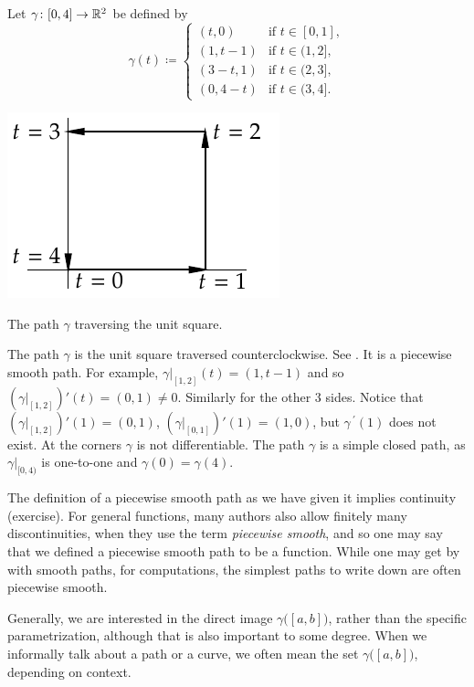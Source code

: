 \begin{example} \label{mv:example:unitsquarepath}
Let $\gamma \colon [0,4] \to {\mathbb{R}}^2$ be defined by
\begin{equation*}
\gamma(t) \coloneqq
\begin{cases}
(t,0)   & \text{if } t \in [0,1],\\
(1,t-1) & \text{if } t \in (1,2],\\
(3-t,1) & \text{if } t \in (2,3],\\
(0,4-t) & \text{if } t \in (3,4].
\end{cases}
\end{equation*}
\begin{myfigureht}
\includegraphics{figures/squarepath}
\caption{The path $\gamma$ traversing the unit square.\label{fig:squarepath}}
\end{myfigureht}

The path $\gamma$ is the unit square traversed
counterclockwise.  See .  It is
a piecewise smooth path.  For example,
$\gamma|_{[1,2]}(t) = (1,t-1)$ and so
$(\gamma|_{[1,2]})'(t) = (0,1) \not= 0$.  Similarly for the other 3 sides.
Notice
that
$(\gamma|_{[1,2]})'(1) = (0,1)$,
$(\gamma|_{[0,1]})'(1) = (1,0)$, but
$\gamma^{\:\prime}(1)$ does not exist.  At the corners $\gamma$ is 
not differentiable.
The path $\gamma$ is a simple closed path, as $\gamma|_{[0,4)}$ is
one-to-one and $\gamma(0)=\gamma(4)$.
\end{example}

The definition of a piecewise smooth path as we have given it implies
continuity (exercise).  For general functions, many authors also
allow finitely many discontinuities, when they use the term \emph{piecewise
smooth}, and so one may say that we defined a piecewise smooth path
to be a \emph{} function.
While one may get by with smooth paths, for computations, the simplest
paths to write down are often piecewise smooth.

Generally, we are interested in the direct image $\gamma\bigl([a,b]\bigr)$,
rather than the specific parametrization, although that is also
important to some degree.  When we informally talk about a path or a curve,
we often mean the set $\gamma\bigl([a,b]\bigr)$, depending
on context.



